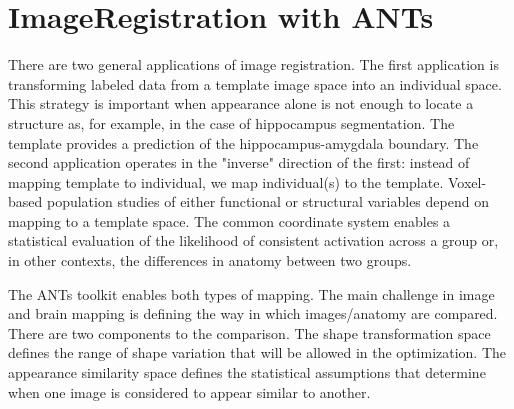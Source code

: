 \documentclass{InsightArticle}
\begin{document}
\section{ImageRegistration with ANTs}
\begin{figure}
\end{figure}
There are two general applications of image registration. The first application is transforming labeled data from a template image space into an individual space. This strategy is important when appearance alone is not enough to locate a structure as, for example, in the case of hippocampus segmentation. The template provides a prediction of the hippocampus-amygdala boundary.
The second application operates in the "inverse" direction of the first: instead of mapping template to individual, we map individual(s) to the template. Voxel-based population studies of either functional or structural variables depend on mapping to a template space. The common coordinate system enables a statistical evaluation of the likelihood of consistent activation across a group or, in other contexts, the differences in anatomy between two groups. 

The ANTs toolkit enables both types of mapping. The main challenge in image and brain mapping is defining the way in which images/anatomy are compared. There are two components to the comparison.
The shape transformation space defines the range of shape variation that will be allowed in the optimization.
The appearance similarity space defines the statistical assumptions that determine when one image is considered to appear similar to another. 
\end{document}
